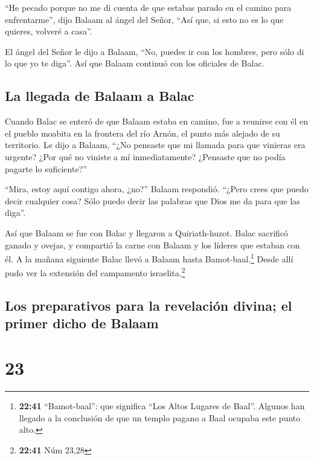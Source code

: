  ``He pecado porque no me di cuenta de que estabas parado
en el camino para enfrentarme'', dijo Balaam al ángel del Señor, ``Así
que, si esto no es lo que quieres, volveré a casa''.

 El ángel del Señor le dijo a Balaam, ``No, puedes ir con
los hombres, pero sólo di lo que yo te diga''. Así que Balaam continuó
con los oficiales de Balac.

\hypertarget{la-llegada-de-balaam-a-balac}{%
\subsection{La llegada de Balaam a
Balac}\label{la-llegada-de-balaam-a-balac}}

 Cuando Balac se enteró de que Balaam estaba en camino,
fue a reunirse con él en el pueblo moabita en la frontera del río Arnón,
el punto más alejado de su territorio.  Le dijo a Balaam,
``¿No pensaste que mi llamada para que vinieras era urgente? ¿Por qué no
viniste a mí inmediatamente? ¿Pensaste que no podía pagarte lo
suficiente?''

 ``Mira, estoy aquí contigo ahora, ¿no?'' Balaam
respondió. ``¿Pero crees que puedo decir cualquier cosa? Sólo puedo
decir las palabras que Dios me da para que las diga''.

 Así que Balaam se fue con Balac y llegaron a
Quiriath-huzot.  Balac sacrificó ganado y ovejas, y
compartió la carne con Balaam y los líderes que estaban con él.
 A la mañana siguiente Balac llevó a Balaam hasta
Bamot-baal.\footnote{\textbf{22:41} ``Bamot-baal'': que significa ``Los
  Altos Lugares de Baal''. Algunos han llegado a la conclusión de que un
  templo pagano a Baal ocupaba este punto alto.} Desde allí pudo ver la
extensión del campamento israelita.\footnote{\textbf{22:41} Núm 23,28}

\hypertarget{los-preparativos-para-la-revelaciuxf3n-divina-el-primer-dicho-de-balaam}{%
\subsection{Los preparativos para la revelación divina; el primer dicho
de
Balaam}\label{los-preparativos-para-la-revelaciuxf3n-divina-el-primer-dicho-de-balaam}}

\hypertarget{section-22}{%
\section{23}\label{section-22}}

